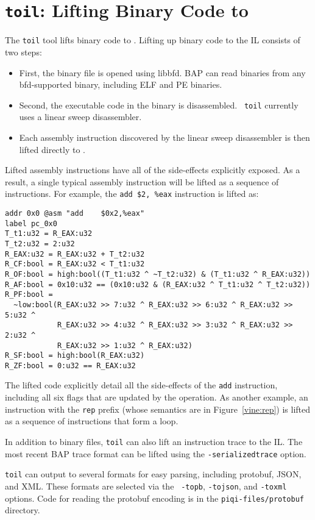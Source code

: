 \section{\texttt{toil}: Lifting Binary Code to \bil}

The {\tt toil} tool lifts binary code to \bil.  Lifting up binary code
to the IL consists of two steps:
\begin{itemize}
\item First, the binary file is opened using libbfd. BAP can read
  binaries from any bfd-supported binary, including ELF and PE
  binaries.

\item Second, the executable code in the binary is disassembled.  {\tt
  toil} currently uses a linear sweep disassembler.

\item Each assembly instruction discovered by the linear sweep disassembler
  is then lifted directly to \bil.
\end{itemize}

Lifted assembly instructions have all of the side-effects explicitly
exposed.  As a result, a single typical assembly instruction will be
lifted as a sequence of \bil instructions.  For example, the {\tt add
  \$2, \%eax} instruction is lifted as:

\begin{centering}
\begin{scriptsize}
\begin{verbatim}
addr 0x0 @asm "add    $0x2,%eax"
label pc_0x0
T_t1:u32 = R_EAX:u32
T_t2:u32 = 2:u32
R_EAX:u32 = R_EAX:u32 + T_t2:u32
R_CF:bool = R_EAX:u32 < T_t1:u32
R_OF:bool = high:bool((T_t1:u32 ^ ~T_t2:u32) & (T_t1:u32 ^ R_EAX:u32))
R_AF:bool = 0x10:u32 == (0x10:u32 & (R_EAX:u32 ^ T_t1:u32 ^ T_t2:u32))
R_PF:bool =
  ~low:bool(R_EAX:u32 >> 7:u32 ^ R_EAX:u32 >> 6:u32 ^ R_EAX:u32 >> 5:u32 ^
            R_EAX:u32 >> 4:u32 ^ R_EAX:u32 >> 3:u32 ^ R_EAX:u32 >> 2:u32 ^
            R_EAX:u32 >> 1:u32 ^ R_EAX:u32)
R_SF:bool = high:bool(R_EAX:u32)
R_ZF:bool = 0:u32 == R_EAX:u32
\end{verbatim}
\end{scriptsize}
\end{centering}

The lifted \bil code explicitly detail all the side-effects of the
{\tt add} instruction, including all six flags that are updated by the
operation.  As another example, an instruction with the {\tt rep}
prefix (whose semantics are in Figure~\ref{vine:rep}) is lifted as a
sequence of instructions that form a loop.

In addition to binary files, {\tt toil} can also lift an instruction
trace to the IL.  The most recent BAP trace format can be lifted using
the {\tt -serializedtrace} option.

{\tt toil} can output to several formats for easy parsing, including
protobuf, JSON, and XML.  These formats are selected via the {\tt
  -topb}, {\tt -tojson}, and {\tt -toxml} options.  Code for reading
the protobuf encoding is in the {\tt piqi-files/protobuf} directory.

